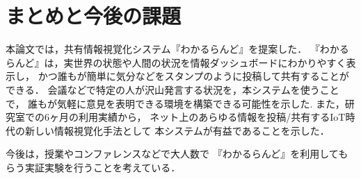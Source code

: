 \section{まとめと今後の課題}
本論文では，共有情報視覚化システム『わかるらんど』を提案した．
『わかるらんど』は，実世界の状態や人間の状況を情報ダッシュボードにわかりやすく表示し，
かつ誰もが簡単に気分などをスタンプのように投稿して共有することができる．
会議などで特定の人が沢山発言する状況を，本システムを使うことで，
誰もが気軽に意見を表明できる環境を構築できる可能性を示した.
また，研究室での6ヶ月の利用実績から，
ネット上のあらゆる情報を投稿/共有するIoT時代の新しい情報視覚化手法として
本システムが有益であることを示した．

今後は，授業やコンファレンスなどで大人数で
『わかるらんど』を利用してもらう実証実験を行うことを考えている．